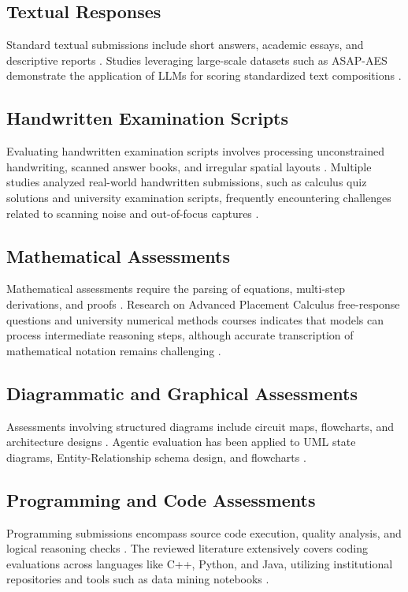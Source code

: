 \documentclass[11pt,a4paper]{article}
\begin{document}
\subsection{Textual Responses}
Standard textual submissions include short answers, academic essays, and descriptive reports \cite{P007, P017}. Studies leveraging large-scale datasets such as ASAP-AES demonstrate the application of LLMs for scoring standardized text compositions \cite{P013}.

\subsection{Handwritten Examination Scripts}
Evaluating handwritten examination scripts involves processing unconstrained handwriting, scanned answer books, and irregular spatial layouts \cite{P004, P010, P026}. Multiple studies analyzed real-world handwritten submissions, such as calculus quiz solutions and university examination scripts, frequently encountering challenges related to scanning noise and out-of-focus captures \cite{P021, P022}.

\subsection{Mathematical Assessments}
Mathematical assessments require the parsing of equations, multi-step derivations, and proofs \cite{P004, P010, P027}. Research on Advanced Placement Calculus free-response questions and university numerical methods courses indicates that models can process intermediate reasoning steps, although accurate transcription of mathematical notation remains challenging \cite{P004, P010}.

\subsection{Diagrammatic and Graphical Assessments}
Assessments involving structured diagrams include circuit maps, flowcharts, and architecture designs \cite{P015, P016, P018}. Agentic evaluation has been applied to UML state diagrams, Entity-Relationship schema design, and flowcharts \cite{P015, P018}.

\subsection{Programming and Code Assessments}
Programming submissions encompass source code execution, quality analysis, and logical reasoning checks \cite{P001, P003, P009, P012, P023, P024, P030}. The reviewed literature extensively covers coding evaluations across languages like C++, Python, and Java, utilizing institutional repositories and tools such as data mining notebooks \cite{P001, P012}.
\end{document}
